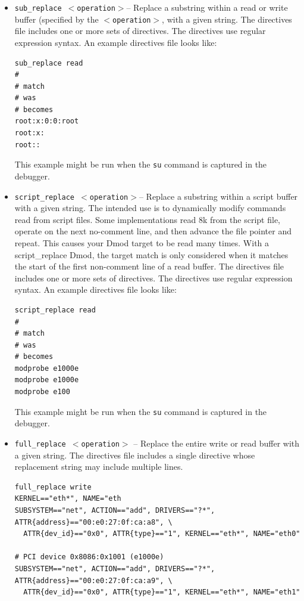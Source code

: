 \documentclass[titlepage]{article}
\begin{document}
\begin{itemize}
\item {\tt sub\_replace $<$operation$>$}-- Replace a substring within a read or write buffer (specified by the
{\tt $<$operation$>$}, with a given string.
The directives file includes one or more sets of directives.
The directives use regular expression syntax.
An example directives file looks like:
\begin{verbatim}
sub_replace read
#
# match
# was
# becomes
root:x:0:0:root
root:x:
root::
\end{verbatim}
\noindent This example might be run when the {\tt su} command is captured in the debugger.

\item {\tt script\_replace $<$operation$>$}-- Replace a substring within a script buffer with a given string.
The intended use is to dynamically modify commands read from script files. Some implementations read 8k
from the script file, operate on the next no-comment line, and then advance the file pointer and repeat.  This causes your Dmod target to be read
many times.  With a script\_replace Dmod, the target match is only considered when it matches the start
of the first non-comment line of a read buffer. 
The directives file includes one or more sets of directives.
The directives use regular expression syntax.
An example directives file looks like:
\begin{verbatim}
script_replace read
#
# match
# was
# becomes
modprobe e1000e
modprobe e1000e
modprobe e100
\end{verbatim}
\noindent This example might be run when the {\tt su} command is captured in the debugger.

\item {\tt full\_replace $<$operation$>$} -- Replace the entire write or read buffer with a given string.
The directives file includes a single directive whose replacement string may include multiple lines.
\begin{verbatim}
full_replace write
KERNEL=="eth*", NAME="eth
SUBSYSTEM=="net", ACTION=="add", DRIVERS=="?*", ATTR{address}=="00:e0:27:0f:ca:a8", \
  ATTR{dev_id}=="0x0", ATTR{type}=="1", KERNEL=="eth*", NAME="eth0"

# PCI device 0x8086:0x1001 (e1000e)
SUBSYSTEM=="net", ACTION=="add", DRIVERS=="?*", ATTR{address}=="00:e0:27:0f:ca:a9", \
  ATTR{dev_id}=="0x0", ATTR{type}=="1", KERNEL=="eth*", NAME="eth1"
\end{verbatim}


\end{itemize}
\end{document}
